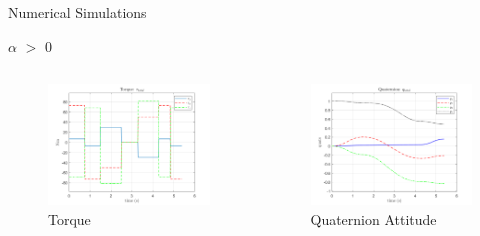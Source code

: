 \documentclass{beamer}
\begin{document}
\begin{frame}{Numerical Simulations}
\begin{block}{$\alpha$ $>$ 0}
	
	\begin{columns}
		\begin{column}{0.5\textwidth}	
			\begin{figure}[H]
				\label{fig:torque_total}
				\begin{center}
					\includegraphics[width=2.25in]{figures/alphaNot0/torque_total.png}
				\end{center}
				\caption{Torque}
			\end{figure}
		\end{column}
		\begin{column}{0.5\textwidth}
			\begin{figure}[H]
				\label{fig:quats_phi_total}
				\begin{center}
					\includegraphics[width=2.25in]{figures/alphaNot0/quats_phi_total.png}
				\end{center}
				\caption{Quaternion Attitude}
			\end{figure}
		\end{column}
	\end{columns}	
\end{block}
\end{frame}
\end{document}
